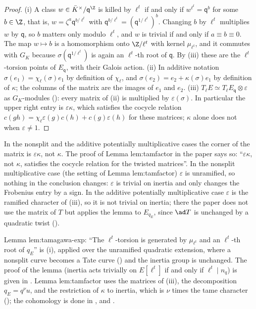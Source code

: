 \begin{proof}
(i) A class $w\in\bar K^\times/\mathsf q^{\Z}$ is killed by $\ell^t$ if and only if $w^{\ell^t}=\mathsf q^b$ for some $b\in\Z$, that is,
$w=\zeta^a\mathsf q^{b/\ell^t}$ with $\mathsf q^{b/\ell^t}=(\mathsf q^{1/\ell^t})^b$. Changing $b$ by $\ell^t$ multiplies $w$ by $\mathsf q$, so $b$ matters only modulo
$\ell^t$, and $w$ is trivial if and only if $a\equiv b\equiv0$. The map $w\mapsto b$ is a homomorphism onto $\Z/\ell^t$ with kernel
$\mu_{\ell^t}$, and it commutes with $G_K$ because $\sigma(\mathsf q^{1/\ell^t})$ is again an $\ell^t$-th root of $\mathsf q$. By
(iii) these are the $\ell^t$-torsion points of $E_{\mathsf q}$, with their Galois action.
(ii) In additive notation $\sigma(e_1)=\chi_\ell(\sigma)e_1$ by definition of $\chi_\ell$, and $\sigma(e_2)=e_2+\kappa(\sigma)e_1$ by definition of
$\kappa$; the columns of the matrix are the images of $e_1$ and $e_2$.
(iii) $T_\ell E\simeq T_\ell E_{\mathsf q}\otimes\varepsilon$ as $G_K$-modules (): every matrix of (ii) is multiplied by
$\varepsilon(\sigma)$. In particular the upper right entry is $\varepsilon\kappa$, which satisfies the cocycle relation
$c(gh)=\chi_\ell\varepsilon(g)c(h)+c(g)\varepsilon(h)$ for these matrices; $\kappa$ alone does not when $\varepsilon\ne1$.
\end{proof}

\begin{warning}\label{warn:reduction:epskappa}
In the nonsplit and the additive potentially multiplicative cases the corner of the matrix is $\varepsilon\kappa$, not $\kappa$. The
proof of Lemma lem:tamfactor in the paper says so: ``$\varepsilon\kappa$, not $\kappa$, satisfies the cocycle relation for the twisted
matrices''. In the nonsplit
multiplicative case (the setting of Lemma lem:tamfactor) $\varepsilon$ is unramified, so nothing in the conclusion changes: $\varepsilon$ is
trivial on inertia and only changes the Frobenius entry by a sign. In the additive potentially multiplicative case $\varepsilon$ is the
ramified character of (iii), so it is not trivial on inertia; there the paper does not
use the matrix of $T$ but applies the lemma to $E_{q_E}$, since $\ad T$ is unchanged by a quadratic twist ().
\end{warning}

\begin{paperlink}
Lemma lem:tamagawa-exp: ``The $\ell^t$-torsion is generated by $\mu_{\ell^t}$ and an $\ell^t$-th root of $q_E$'' is
(i), applied over the unramified quadratic extension, where a nonsplit curve becomes a Tate
curve () and the inertia group is unchanged. The proof of the lemma (inertia acts trivially on
$E[\ell^t]$ if and only if $\ell^t\mid n_q$) is given in . Lemma lem:tamfactor uses the matrices of (iii), the
decomposition $q_E=q^\nu u$, and the restriction of $\kappa$ to inertia, which is $\nu$ times the tame character (); the
cohomology is done in ,  and .
\end{paperlink}

